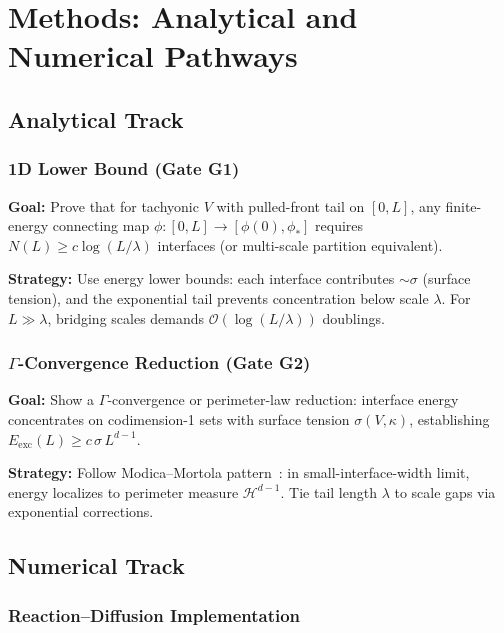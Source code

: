 \documentclass{article}
\begin{document}
\section{Methods: Analytical and Numerical Pathways}
\label{sec:methods}

\subsection{Analytical Track}

\subsubsection{1D Lower Bound (Gate G1)}

\textbf{Goal:} Prove that for tachyonic $V$ with pulled-front tail on $[0,L]$, any finite-energy connecting map $\phi:[0,L]\to[\phi(0),\phi_\ast]$ requires $N(L)\ge c\log(L/\lambda)$ interfaces (or multi-scale partition equivalent).

\textbf{Strategy:} Use energy lower bounds: each interface contributes $\sim\sigma$ (surface tension), and the exponential tail prevents concentration below scale $\lambda$. For $L\gg\lambda$, bridging scales demands $\mathcal{O}(\log(L/\lambda))$ doublings.

\subsubsection{$\Gamma$-Convergence Reduction (Gate G2)}

\textbf{Goal:} Show a $\Gamma$-convergence or perimeter-law reduction: interface energy concentrates on codimension-1 sets with surface tension $\sigma(V,\kappa)$, establishing $E_{\text{exc}}(L)\ge c\,\sigma\,L^{d-1}$.

\textbf{Strategy:} Follow Modica--Mortola pattern~\cite{ModicaMortola1977}: in small-interface-width limit, energy localizes to perimeter measure $\mathcal{H}^{d-1}$. Tie tail length $\lambda$ to scale gaps via exponential corrections.

\subsection{Numerical Track}

\subsubsection{Reaction--Diffusion Implementation}
\end{document}
